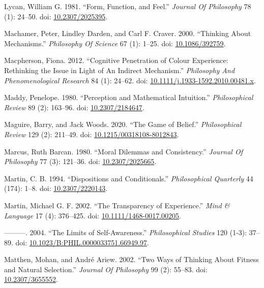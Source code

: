 \documentclass[
  10pt,
  letterpaper,
  DIV=11,
  numbers=noendperiod,
  twoside]{scrartcl}
\newlength{\cslhangindent}
\newenvironment{CSLReferences}[2] %
 {\begin{list}{}{%
  \setlength{\itemindent}{0pt}
  \setlength{\leftmargin}{0pt}
  \setlength{\parsep}{0pt}
  \ifodd #1
   \setlength{\leftmargin}{\cslhangindent}
   \setlength{\itemindent}{-1\cslhangindent}
  \fi
  \setlength{\itemsep}{#2\baselineskip}}}
 {\end{list}}
\begin{document}
\begin{CSLReferences}{1}{0}
Lycan, William G. 1981. {``Form, Function, and Feel.''} \emph{Journal Of
Philosophy} 78 (1): 24--50. doi:
\href{https://doi.org/10.2307/2025395}{10.2307/2025395}.

Machamer, Peter, Lindley Darden, and Carl F. Craver. 2000. {``Thinking
About Mechanisms.''} \emph{Philosophy Of Science} 67 (1): 1--25. doi:
\href{https://doi.org/10.1086/392759}{10.1086/392759}.

Macpherson, Fiona. 2012. {``Cognitive Penetration of Colour Experience:
Rethinking the Issue in Light of An Indirect Mechanism.''}
\emph{Philosophy And Phenomenological Research} 84 (1): 24--62. doi:
\href{https://doi.org/10.1111/j.1933-1592.2010.00481.x}{10.1111/j.1933-1592.2010.00481.x}.

Maddy, Penelope. 1980. {``Perception and Mathematical Intuition.''}
\emph{Philosophical Review} 89 (2): 163--96. doi:
\href{https://doi.org/10.2307/2184647}{10.2307/2184647}.

Maguire, Barry, and Jack Woods. 2020. {``The Game of Belief.''}
\emph{Philosophical Review} 129 (2): 211--49. doi:
\href{https://doi.org/10.1215/00318108-8012843}{10.1215/00318108-8012843}.

Marcus, Ruth Barcan. 1980. {``Moral Dilemmas and Consistency.''}
\emph{Journal Of Philosophy} 77 (3): 121--36. doi:
\href{https://doi.org/10.2307/2025665}{10.2307/2025665}.

Martin, C. B. 1994. {``Dispositions and Conditionals.''}
\emph{Philosophical Quarterly} 44 (174): 1--8. doi:
\href{https://doi.org/10.2307/2220143}{10.2307/2220143}.

Martin, Michael G. F. 2002. {``The Transparency of Experience.''}
\emph{Mind \& Language} 17 (4): 376--425. doi:
\href{https://doi.org/10.1111/1468-0017.00205}{10.1111/1468-0017.00205}.

---------. 2004. {``The Limits of Self-Awareness.''} \emph{Philosophical
Studies} 120 (1-3): 37--89. doi:
\href{https://doi.org/10.1023/B:PHIL.0000033751.66949.97}{10.1023/B:PHIL.0000033751.66949.97}.

Matthen, Mohan, and André Ariew. 2002. {``Two Ways of Thinking About
Fitness and Natural Selection.''} \emph{Journal Of Philosophy} 99 (2):
55--83. doi: \href{https://doi.org/10.2307/3655552}{10.2307/3655552}.


\end{CSLReferences}
\end{document}
